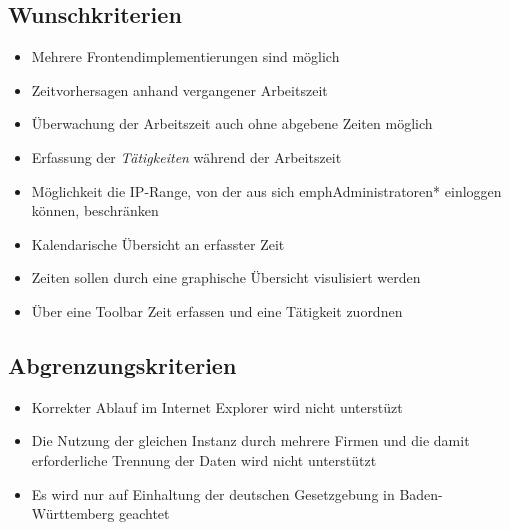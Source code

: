 \subsection{Wunschkriterien}

\begin{itemize}
	\item Mehrere Frontendimplementierungen sind möglich
	\item Zeitvorhersagen anhand vergangener Arbeitszeit
	\item Überwachung der Arbeitszeit auch ohne abgebene Zeiten möglich
	\item Erfassung der \emph{Tätigkeiten} während der Arbeitszeit
	\item Möglichkeit die IP-Range, von der aus sich emph{Administratoren*} einloggen können, beschränken
	\item Kalendarische Übersicht an erfasster Zeit
	\item Zeiten sollen durch eine graphische Übersicht visulisiert werden
	\item Über eine Toolbar Zeit erfassen und eine Tätigkeit zuordnen
\end{itemize}


\subsection{Abgrenzungskriterien}
\begin{itemize}
	\item Korrekter Ablauf im Internet Explorer wird nicht unterstüzt
	\item Die Nutzung der gleichen Instanz durch mehrere Firmen und die damit erforderliche Trennung der Daten wird nicht unterstützt
	\item Es wird nur auf Einhaltung der deutschen Gesetzgebung in Baden-Württemberg geachtet
\end{itemize}
